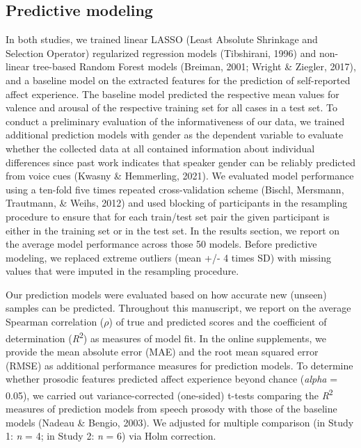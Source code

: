 \documentclass[
  english,
  man,floatsintext]{apa6}
\begin{document}
\hypertarget{predictive-modeling}{%
\subsection{Predictive modeling}\label{predictive-modeling}}

In both studies, we trained linear LASSO (Least Absolute Shrinkage and Selection Operator) regularized regression models (Tibshirani, 1996) and non-linear tree-based Random Forest models (Breiman, 2001; Wright \& Ziegler, 2017), and a baseline model on the extracted features for the prediction of self-reported affect experience. The baseline model predicted the respective mean values for valence and arousal of the respective training set for all cases in a test set. To conduct a preliminary evaluation of the informativeness of our data, we trained additional prediction models with gender as the dependent variable to evaluate whether the collected data at all contained information about individual differences since past work indicates that speaker gender can be reliably predicted from voice cues (Kwasny \& Hemmerling, 2021). We evaluated model performance using a ten-fold five times repeated cross-validation scheme (Bischl, Mersmann, Trautmann, \& Weihs, 2012) and used blocking of participants in the resampling procedure to ensure that for each train/test set pair the given participant is either in the training set or in the test set. In the results section, we report on the average model performance across those 50 models. Before predictive modeling, we replaced extreme outliers (mean +/- 4 times SD) with missing values that were imputed in the resampling procedure.

Our prediction models were evaluated based on how accurate new (unseen) samples can be predicted. Throughout this manuscript, we report on the average Spearman correlation (\(\rho\)) of true and predicted scores and the coefficient of determination (\emph{R}\textsuperscript{2}) as measures of model fit. In the online supplements, we provide the mean absolute error (MAE) and the root mean squared error (RMSE) as additional performance measures for prediction models. To determine whether prosodic features predicted affect experience beyond chance (\emph{alpha} = 0.05), we carried out variance-corrected (one-sided) t-tests comparing the \emph{R}\textsuperscript{2} measures of prediction models from speech prosody with those of the baseline models (Nadeau \& Bengio, 2003). We adjusted for multiple comparison (in Study 1: \emph{n} = 4; in Study 2: \emph{n} = 6) via Holm correction.
\end{document}
